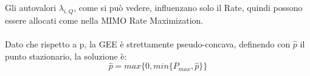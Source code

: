 Gli autovalori $\lambda_{i,Q}$, come si può vedere, influenzano solo il Rate, quindi possono essere allocati come nella MIMO Rate Maximization.\\ \\
Dato che rispetto a p, la GEE è strettamente pseudo-concava, definendo con $\hat{p}$ il punto stazionario, la soluzione è:
\begin{equation*}
    \hat{p} = max \{0, min\{P_{max}, \hat{p}\}\}
\end{equation*}

